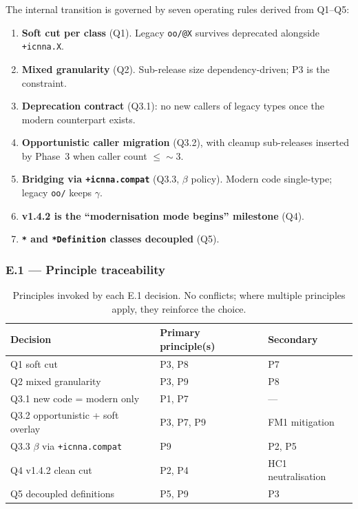 \documentclass[11pt,a4paper]{article}
\begin{document}
The internal transition is governed by seven operating rules derived from Q1--Q5:

\begin{enumerate}
    \item \textbf{Soft cut per class} (Q1). Legacy \texttt{oo/@X} survives deprecated alongside \texttt{+icnna.X}.
    \item \textbf{Mixed granularity} (Q2). Sub-release size dependency-driven; P3 is the constraint.
    \item \textbf{Deprecation contract} (Q3.1): no new callers of legacy types once the modern counterpart exists.
    \item \textbf{Opportunistic caller migration} (Q3.2), with cleanup sub-releases inserted by Phase~3 when caller count $\leq \sim 3$.
    \item \textbf{Bridging via \texttt{+icnna.compat}} (Q3.3, $\beta$ policy). Modern code single-type; legacy \texttt{oo/} keeps $\gamma$.
    \item \textbf{v1.4.2 is the ``modernisation mode begins'' milestone} (Q4).
    \item \textbf{\texttt{*} and \texttt{*Definition} classes decoupled} (Q5).
\end{enumerate}

\subsubsection{E.1 --- Principle traceability}

\begin{table}[h]
\centering
\small
\begin{tabular}{lll}
\toprule
\textbf{Decision} & \textbf{Primary principle(s)} & \textbf{Secondary} \\
\midrule
Q1 soft cut & P3, P8 & P7 \\
Q2 mixed granularity & P3, P9 & P8 \\
Q3.1 new code = modern only & P1, P7 & --- \\
Q3.2 opportunistic + soft overlay & P3, P7, P9 & FM1 mitigation \\
Q3.3 $\beta$ via \texttt{+icnna.compat} & P9 & P2, P5 \\
Q4 v1.4.2 clean cut & P2, P4 & HC1 neutralisation \\
Q5 decoupled definitions & P5, P9 & P3 \\
\bottomrule
\end{tabular}
\caption{Principles invoked by each E.1 decision. No conflicts; where multiple principles apply, they reinforce the choice.}
\end{table}
\end{document}
